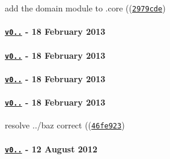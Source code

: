 \begin{DoxyItemize}
\item add the domain module to .core ((\href{https://github.com/browserify/resolve/commit/2979cdea615fe724de62d88cb221c1d1824d0f10}{\tt {\ttfamily 2979cde}})
\end{DoxyItemize}

\paragraph*{\href{https://github.com/browserify/resolve/compare/v0.2.6...v0.2.7}{\tt v0..} -\/ 18 February 2013}

\paragraph*{\href{https://github.com/browserify/resolve/compare/v0.2.5...v0.2.6}{\tt v0..} -\/ 18 February 2013}

\paragraph*{\href{https://github.com/browserify/resolve/compare/v0.2.4...v0.2.5}{\tt v0..} -\/ 18 February 2013}

\paragraph*{\href{https://github.com/browserify/resolve/compare/v0.2.3...v0.2.4}{\tt v0..} -\/ 18 February 2013}


\begin{DoxyItemize}
\item resolve \textquotesingle{}../baz\textquotesingle{} correct ((\href{https://github.com/browserify/resolve/commit/46fe923c20feeceac783e67cfa84d07222bc17fa}{\tt {\ttfamily 46fe923}})
\end{DoxyItemize}

\paragraph*{\href{https://github.com/browserify/resolve/compare/v0.2.2...v0.2.3}{\tt v0..} -\/ 12 August 2012}


